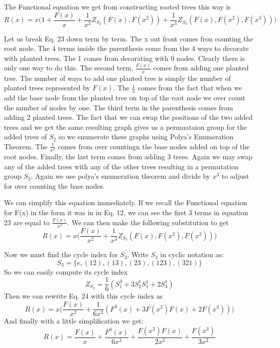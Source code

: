 \documentclass{article}
\begin{document}
The Functional equation we get from constructing rooted trees this way is
\begin{equation}
R(x)=x\Big(1+\frac{F(x)}{x}+\frac{1}{x^2}Z_{S_2}(F(x),F(x^2)) +\frac{1}{x^3}Z_{S_3}(F(x),F(x^2),F(x^3))\Big)
\end{equation}

	Let us break Eq. 23 down term by term. The x out front comes fron counting the root node. The 4 terms inside the parenthesis come from the 4 ways to decorate with planted trees. The 1 comes from decorating with 0 nodes. Clearly there is only one way to do this. The second term, \(\frac{F(x)}{x}\) comes from adding one planted tree. The number of ways to add one planted tree is simply the number of planted trees represented by \(F(x)\). The \(\frac{1}{x}\) comes from the fact that when we add the base node from the planted tree on top of the root node we over count the number of nodes by one. The third term in the parenthesis comes from adding 2 planted trees. The fact that we can swap the positions of the two added trees and we get the same resulting graph gives us a permuataion group for the added trees of \(S_2\) so we enumerate these graphs using Polya's Enumeration Theorem. The \(\frac{1}{x^2}\) comes from over countingn the base nodes added on top of the root nodes. Finally, the last term comes from adding 3 trees. Again we may swap any of the added trees with any of the other trees resulting in a permutation group \(S_3\). Again we use polya's enumeration theorem and divide by \(x^3\) to adjust for over counting the base nodes. 
	
	We can simplify this equation immediately. If we recall the Functional equation for F(x) in the form it was in in Eq. 12, we can see the first 3 terms in equation 23 are equal to \(\frac{F(x)}{x^2}\). We can then make the following substitution to get
\begin{equation}
R(x)=x\Big(\frac{F(x)}{x^2} +\frac{1}{x^3}Z_{S_3}(F(x),F(x^2),F(x^3))\Big)
\end{equation}

Now we must find the cycle index for \(S_3\). Write \(S_3\) in cyclic notation as:
\begin{equation}
S_3=\{e,(12),(13),(23),(123),(321)\}
\end{equation}
So we can easily compute its cycle index
\begin{equation}
Z_{S_3}=\frac{1}{6}(S_1^3+3S_2^1S_1^1+2S_3^1)
\end{equation}
Then we can rewrite Eq. 24 with this cycle index as
\begin{equation}
R(x)=x\Big(\frac{F(x)}{x^2} +\frac{1}{6x^3}(F^3(x)+3F(x^2)F(x)+2F(x^3))\Big)
\end{equation}
And finally with a little simplification we get:
\begin{equation}
R(x)=\frac{F(x)}{x} +\frac{F^3(x)}{6x^3}+\frac{F(x^2)F(x)}{2x^2}+\frac{F(x^3)}{3x^2}
\end{equation}
\end{document}
